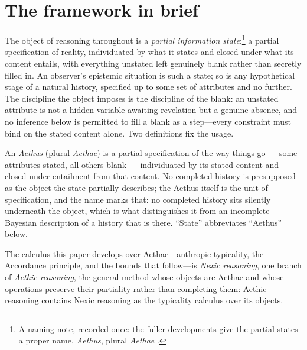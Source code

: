 \section{The framework in brief}
\label{sec:framework}

The object of reasoning throughout is a \emph{partial information state}:\footnote{A naming note, recorded once: the fuller developments give the partial states a proper name, \emph{Aethus}, plural \emph{Aethae} \cite{Nexus, Aethus}.} a partial specification of reality, individuated by what it states and closed under what its content entails, with everything unstated left genuinely blank rather than secretly filled in. An observer's epistemic situation is such a state; so is any hypothetical stage of a natural history, specified up to some set of attributes and no further. The discipline the object imposes is the discipline of the blank: an unstated attribute is not a hidden variable awaiting revelation but a genuine absence, and no inference below is permitted to fill a blank as a step---every constraint must bind on the stated content alone. Two definitions fix the usage.

\begin{definition}
An \emph{Aethus} (plural \emph{Aethae}) is a partial specification of the way things go --- some attributes stated, all others blank --- individuated by its stated content and closed under entailment from that content. No completed history is presupposed as the object the state partially describes; the Aethus itself is the unit of specification, and the name marks that: no completed history sits silently underneath the object, which is what distinguishes it from an incomplete Bayesian description of a history that is there. ``State'' abbreviates ``Aethus'' below.
\end{definition}
\noindent The calculus this paper develops over Aethae---anthropic typicality, the Accordance principle, and the bounds that follow---is \emph{Nexic reasoning}, one branch of \emph{Aethic reasoning}, the general method whose objects are Aethae and whose operations preserve their partiality rather than completing them: Aethic reasoning contains Nexic reasoning as the typicality calculus over its objects.

